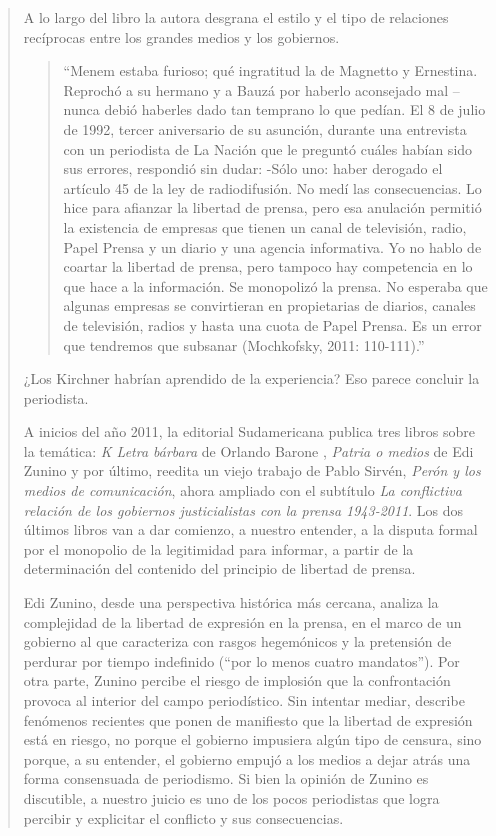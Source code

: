 \begin{quote}
A lo largo del libro la autora desgrana el estilo y el tipo de relaciones recíprocas entre los grandes medios y los gobiernos.

\begin{quote}
	\enquote{Menem estaba furioso; qué ingratitud la de Magnetto y Ernestina. Reprochó a su hermano y a Bauzá por haberlo aconsejado mal --nunca debió haberles dado tan temprano lo que pedían. El 8 de julio de 1992, tercer aniversario de su asunción, durante una entrevista con un periodista de La Nación que le preguntó cuáles habían sido sus errores, respondió sin dudar: -Sólo uno: haber derogado el artículo 45 de la ley de radiodifusión. No medí las consecuencias. Lo hice para afianzar la libertad de prensa, pero esa anulación permitió la existencia de empresas que tienen un canal de televisión, radio, Papel Prensa y un diario y una agencia informativa. Yo no hablo de coartar la libertad de prensa, pero tampoco hay competencia en lo que hace a la información. Se monopolizó la prensa. No esperaba que algunas empresas se convirtieran en propietarias de diarios, canales de televisión, radios y hasta una cuota de Papel Prensa. Es un error que tendremos que subsanar (Mochkofsky, 2011: 110-111).}
\end{quote}


¿Los Kirchner habrían aprendido de la experiencia? Eso parece concluir la periodista.

A inicios del año 2011, la editorial Sudamericana publica tres libros sobre la temática: \emph{K Letra bárbara} de Orlando Barone , \emph{Patria o medios} de Edi Zunino y por último, reedita un viejo trabajo de Pablo Sirvén, \emph{Perón y los medios de comunicación}, ahora ampliado con el subtítulo \emph{La conflictiva relación de los gobiernos justicialistas con la prensa 1943-2011}. Los dos últimos libros van a dar comienzo, a nuestro entender, a la disputa formal por el monopolio de la legitimidad para informar, a partir de la determinación del contenido del principio de libertad de prensa.

Edi Zunino, desde una perspectiva histórica más cercana, analiza la complejidad de la libertad de expresión en la prensa, en el marco de un gobierno al que caracteriza con rasgos hegemónicos y la pretensión de perdurar por tiempo indefinido (``por lo menos cuatro mandatos''). Por otra parte, Zunino percibe el riesgo de implosión que la confrontación provoca al interior del campo periodístico. Sin intentar mediar, describe fenómenos recientes que ponen de manifiesto que la libertad de expresión  está en riesgo, no porque el gobierno impusiera algún tipo de censura, sino porque, a su entender, el gobierno empujó a los medios a dejar atrás una forma consensuada de periodismo. Si bien la opinión de Zunino es discutible, a nuestro juicio es uno de los pocos periodistas que logra percibir y explicitar el conflicto y sus consecuencias.


\end{quote}
